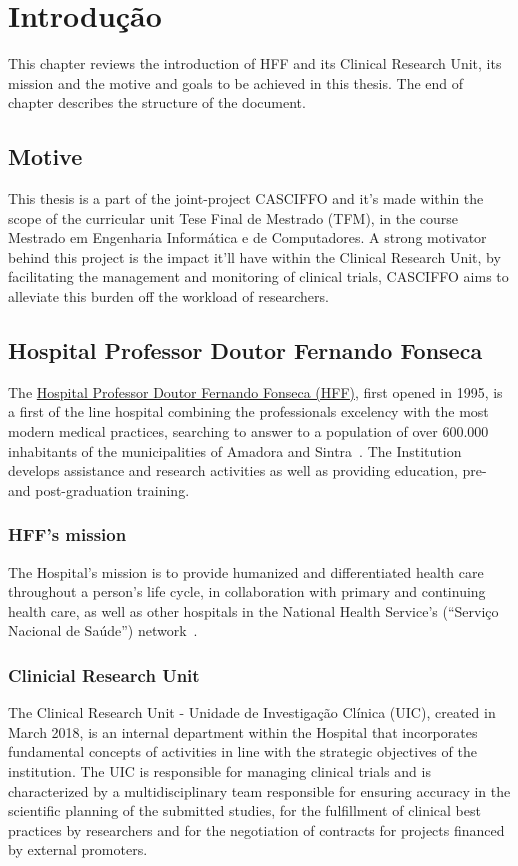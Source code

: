\chapter{Introdução}
\label{ch:intro}
This chapter reviews the introduction of HFF and its Clinical Research Unit, its mission and the motive and goals to be achieved in this thesis. The end of chapter describes the structure of the document.

\section{Motive}
This thesis is a part of the joint-project CASCIFFO and it's made within the scope of the curricular unit Tese Final de Mestrado (TFM), in the course Mestrado em Engenharia Informática e de Computadores. A strong motivator behind this project is the impact it'll have within the Clinical Research Unit, by facilitating the management and monitoring of clinical trials, CASCIFFO aims to alleviate this burden off the workload of researchers.

\section{Hospital Professor Doutor Fernando Fonseca}
\label{ch:intro:sec:intro}

The \href{https://hff.min-saude.pt/}{Hospital Professor Doutor Fernando Fonseca (HFF)}, first opened in 1995, is a first of the line hospital combining the professionals excelency with the most modern medical practices, searching to answer to a population of over 600.000 inhabitants of the municipalities of Amadora and Sintra~\cite{hff-intro}. The Institution develops assistance and research activities as well as providing education, pre- and post-graduation training.

\subsection{HFF's mission}
The Hospital's mission is to provide humanized and differentiated health
care throughout a person's life cycle, in collaboration with primary and
continuing health care, as well as other hospitals in the National
Health Service's (``Serviço Nacional de Saúde'') network~\cite{hff-uic}.

\subsection{Clinicial Research Unit}
The Clinical Research Unit - Unidade de Investigação Clínica
(UIC), created in March 2018, is an internal department within the
Hospital that incorporates fundamental concepts of activities in line
with the strategic objectives of the institution. The UIC is responsible
for managing clinical trials and is characterized by a
multidisciplinary team responsible for ensuring accuracy in the
scientific planning of the submitted studies, for the fulfillment of
clinical best practices by researchers and for the negotiation of
contracts for projects financed by external promoters.\\


